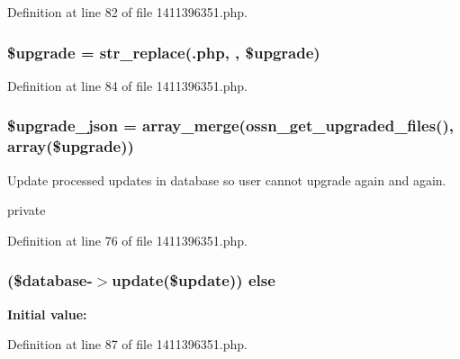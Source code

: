 Definition at line 82 of file 1411396351.\+php.

\subsubsection[{\texorpdfstring{\$upgrade}{$upgrade}}]{\setlength{\rightskip}{0pt plus 5cm}\$upgrade = str\+\_\+replace(\textquotesingle{}.php\textquotesingle{}, \textquotesingle{}\textquotesingle{}, \$upgrade)}\hypertarget{1411396351_8php_a9084097ce600d3cc7a79a20ecaea9906}{}\label{1411396351_8php_a9084097ce600d3cc7a79a20ecaea9906}


Definition at line 84 of file 1411396351.\+php.

\subsubsection[{\texorpdfstring{\$upgrade\+\_\+json}{$upgrade_json}}]{\setlength{\rightskip}{0pt plus 5cm}\$upgrade\+\_\+json = array\+\_\+merge({\bf ossn\+\_\+get\+\_\+upgraded\+\_\+files}(), array(\$upgrade))}\hypertarget{1411396351_8php_a512525d0f5eb608ac72ca7b85e5fbf65}{}\label{1411396351_8php_a512525d0f5eb608ac72ca7b85e5fbf65}
Update processed updates in database so user cannot upgrade again and again.

private 

Definition at line 76 of file 1411396351.\+php.

\subsubsection[{\texorpdfstring{else}{else}}]{ (\${\bf database}-\/$>${\bf update}(\${\bf update})) else}\hypertarget{1411396351_8php_aa7c58ee9f19ec0c0f3a1951839273e79}{}\label{1411396351_8php_aa7c58ee9f19ec0c0f3a1951839273e79}
{\bfseries Initial value\+:}


Definition at line 87 of file 1411396351.\+php.

